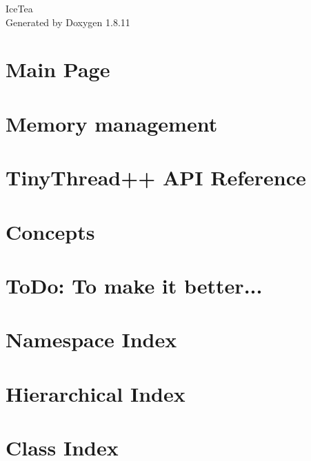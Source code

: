\documentclass[twoside]{book}
\newcommand{\+}{\discretionary{\mbox{\scriptsize$\hookleftarrow$}}{}{}}
\newcommand{\clearemptydoublepage}{%
  \newpage{\pagestyle{empty}\cleardoublepage}%
}
\begin{document}
\hypersetup{pageanchor=false,
             bookmarksnumbered=true,
             pdfencoding=unicode
            }
\begin{titlepage}
\vspace*{7cm}
\begin{center}%
{\Large Ice\+Tea }\\
\vspace*{1cm}
{\large Generated by Doxygen 1.8.11}\\
\end{center}
\end{titlepage}
\clearemptydoublepage
\tableofcontents
\clearemptydoublepage
{}
\hypersetup{pageanchor=true}

\chapter{Main Page}
\label{index}\hypertarget{index}{}
\chapter{Memory management}
\label{memorymanager}
\hypertarget{memorymanager}{}

\chapter{Tiny\+Thread++ A\+PI Reference}
\label{tinythread}
\hypertarget{tinythread}{}

\chapter{Concepts}
\label{md_Concepts}
\hypertarget{md_Concepts}{}

\chapter{To\+Do\+: To make it better...}
\label{md_TODO}
\hypertarget{md_TODO}{}

\chapter{Namespace Index}

\chapter{Hierarchical Index}

\chapter{Class Index}

\end{document}
